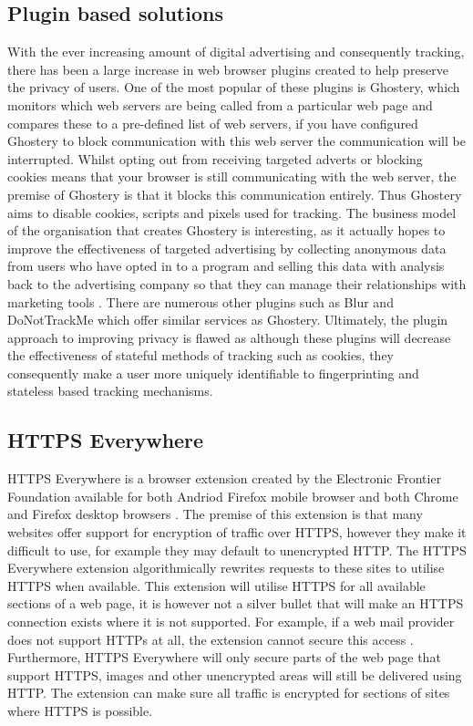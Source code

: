\documentclass[12pt]{article}
\begin{document}
\subsection{Plugin based solutions}
With the ever increasing amount of digital advertising and consequently tracking, there has been a large increase in web browser plugins created to help preserve the privacy of users. One of the most popular of these plugins is Ghostery, which monitors which web servers are being called from a particular web page and compares these to a pre-defined list of web servers, if you have configured Ghostery to block communication with this web server the communication will be interrupted. Whilst opting out from receiving targeted adverts or blocking cookies means that your browser is still communicating with the web server, the premise of Ghostery is that it blocks this communication entirely. Thus Ghostery aims to disable cookies, scripts and pixels used for tracking. The business model of the organisation that creates Ghostery is interesting, as it actually hopes to improve the effectiveness of targeted advertising by collecting anonymous data from users who have opted in to a program and selling this data with analysis back to the advertising company so that they can manage their relationships with marketing tools \parencite{ghostery}. There are numerous other plugins such as Blur and DoNotTrackMe which offer similar services as Ghostery. Ultimately, the plugin approach to improving privacy is flawed as although these plugins will decrease the effectiveness of stateful methods of tracking such as cookies, they consequently make a user more uniquely identifiable to fingerprinting and stateless based tracking mechanisms.

\subsection{HTTPS Everywhere}
HTTPS Everywhere is a browser extension created by the Electronic Frontier Foundation available for both Andriod Firefox mobile browser and both Chrome and Firefox desktop browsers \parencite{httpsEverywhere}. The premise of this extension is that many websites offer support for encryption of traffic over HTTPS, however they make it difficult to use, for example they may default to unencrypted HTTP. The HTTPS Everywhere extension algorithmically rewrites requests to these sites to utilise HTTPS when available. This extension will utilise HTTPS for all available sections of a web page, it is however not a silver bullet that will make an HTTPS connection exists where it is not supported. For example, if a web mail provider does not support HTTPs at all, the extension cannot secure this access \parencite{httpsEverywhere}. Furthermore, HTTPS Everywhere will only secure parts of the web page that support HTTPS, images and other unencrypted areas will still be delivered using HTTP. The extension can make sure all traffic is encrypted for sections of sites where HTTPS is possible. 
\end{document}

